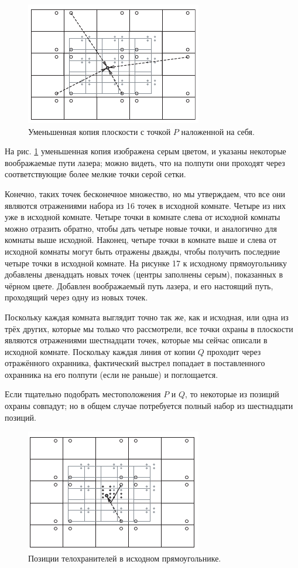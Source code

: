 \begin{figure}[t!]
\centering
\includegraphics[scale=1]{pics/room2}
\caption{Уменьшенная копия плоскости с точкой $P$ наложенной на себя.}
\label{pic:room2}
\end{figure}

На рис. \ref{pic:room2} уменьшенная копия изображена серым цветом, и указаны некоторые воображаемые пути лазера; можно видеть, что на полпути они проходят через соответствующие более мелкие точки серой сетки.

Конечно, таких точек бесконечное множество, но мы утверждаем, что все они являются отражениями набора из 16 точек в исходной комнате.
Четыре из них уже в исходной комнате.
Четыре точки в комнате слева от исходной комнаты можно отразить обратно, чтобы дать четыре новые точки, и аналогично для комнаты выше исходной.
Наконец, четыре точки в комнате выше и слева от исходной комнаты могут быть отражены дважды, чтобы получить последние четыре точки в исходной комнате.
На рисунке 17 к исходному прямоугольнику добавлены двенадцать новых точек (центры заполнены серым), показанных в чёрном цвете.
Добавлен воображаемый путь лазера, и его настоящий путь, проходящий через одну из новых точек.

Поскольку каждая комната выглядит точно так же, как и исходная, или одна из трёх других, которые мы только что рассмотрели, все точки охраны в плоскости являются отражениями шестнадцати точек, которые мы сейчас описали в исходной комнате.
Поскольку каждая линия от копии $Q$ проходит через отражённого охранника, фактический выстрел попадает в поставленного охранника на его полпути (если не раньше) и поглощается.

Если тщательно подобрать местоположения $P$ и $Q$, то некоторые из позиций охраны совпадут;
но в общем случае потребуется полный набор из шестнадцати позиций.

\begin{figure}[h!]
\centering
\includegraphics[scale=1]{pics/room3}
\caption{Позиции телохранителей в исходном прямоугольнике.}
\label{pic:room3}
\end{figure}

